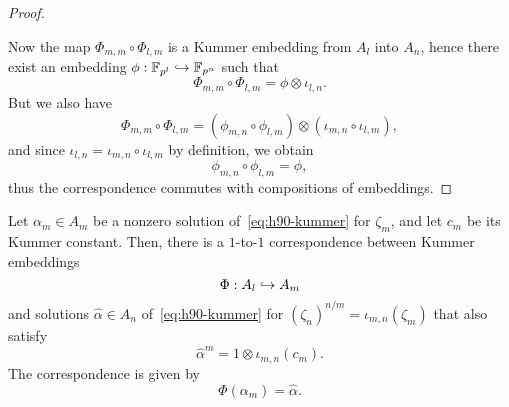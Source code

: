 \begin{proof}
\begin{center}
\end{center}
Now the map $\Phi_{m, m}\circ\Phi_{l,m}$ is a Kummer embedding from $A_l$ into
$A_n$, hence there exist an embedding
$\phi:\mathbb{F}_{p^{l}}\hookrightarrow\mathbb{F}_{p^{n}}$ such that 
\[
  \Phi_{m, m}\circ\Phi_{l,m}=\phi\otimes\iota_{l, n}.
\]
But we also have 
\[
  \Phi_{m, m}\circ\Phi_{l,m}=(\phi_{m, n}\circ\phi_{l,
  m})\otimes(\iota_{m, n}\circ\iota_{l, m}),
\]
and since $\iota_{l,n}=\iota_{m, n}\circ\iota_{l, m}$ by definition, we obtain
\[
  \phi_{m, n}\circ\phi_{l, m}=\phi,
\]
thus the correspondence commutes with compositions of embeddings.
\end{proof}
\begin{prop}
  \label{prop:correspondence-solutions}
  Let $\alpha_m\in A_m$ be a nonzero solution of~\eqref{eq:h90-kummer} for
  $\zeta_m$, and let $c_m$ be its Kummer constant. Then, there is a $1$-to-$1$
  correspondence between Kummer embeddings
  \[
    \Phi:A_l\hookrightarrow A_m
  \]
  and solutions $\hat\alpha\in A_n$ of~\eqref{eq:h90-kummer} for
  $(\zeta_n)^{n/m}=\iota_{m, n}(\zeta_m)$ that also satisfy
  \[
    \hat\alpha^m = 1\otimes\iota_{m, n}(c_m).
  \]
  The correspondence is given by
  \[
    \Phi(\alpha_m) = \hat\alpha.
  \]
\end{prop}
